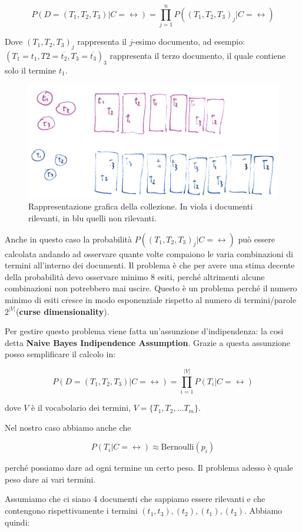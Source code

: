 $$
P(D=(T_1,T_2, T_3) | C=\rel) = \prod\limits_{j=1}^{n} P((T_1, T_2,T_3)_j | C = \rel)
$$

Dove $(T_1, T_2,T_3)_j$ rappresenta il $j$-esimo documento, ad esempio: $(T_1 = t_1, T2 = \overline{t_2},T_3 = \overline{t_3})_3$ rappresenta il terzo documento, il quale contiene solo il termine $t_1$.

\begin{figure}[htbp]
	\centering
	\includegraphics[width=.5\textwidth]{images/l10-fig-2}
	\caption{Rappresentazione grafica della collezione. In viola i documenti rilevanti, in blu quelli non rilevanti.}
\end{figure}

Anche in questo caso la probabilità $P((T_1, T_2,T_3)_j | C = \rel)$ può essere calcolata andando ad osservare quante volte compaiono le varia combinazioni di termini all'interno dei documenti.
Il problema è che per avere una stima decente della probabilità devo osservare minimo 8 esiti, perché altrimenti alcune combinazioni non potrebbero mai uscire.
Questo è un problema perché il numero minimo di esiti cresce in modo esponenziale rispetto al numero di termini/parole $2^{|V|}$(\textbf{curse dimensionality}).

Per gestire questo problema viene fatta un'assunzione d'indipendenza: la cosi detta \textbf{Naive Bayes Indipendence Assumption}.
Grazie a questa assunzione posso semplificare il calcolo in:

$$
P(D=(T_1, T_2, T_3) | C = \rel) = \prod\limits_{i = 1}^{|V|}P(T_i|C=\rel)
$$

\noindent dove $V$ è il vocabolario dei termini, $V = \{ T_1, T_2, \ldots T_m\}$.

Nel nostro caso abbiamo anche che

$$
P(T_i|C=\rel) \approx \text{Bernoulli}(p_i)
$$

\noindent perché possiamo dare ad ogni termine un certo peso.
Il problema adesso è quale peso dare ai vari termini.

Assumiamo che ci siano 4 documenti che sappiamo essere rilevanti e che contengono rispettivamente i termini $(t_1, t_3), (t_2), (t_1), (t_3)$. Abbiamo quindi:

